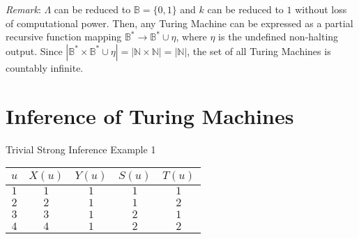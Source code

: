 \documentclass[11pt]{article}
\newcommand{\N}{\mathbb{N}}
\newcommand{\B}{\mathbb{B}}
\begin{document}
\bigbreak

\textit{Remark}: $\Lambda$ can be reduced to $ \B = \{0, 1\} $ and $ k $ can be reduced to $ 1 $ without loss of computational power. Then, any Turing Machine can be expressed as a partial recursive function mapping $ \B^{*} \rightarrow \B^{*} \cup \eta $, where $ \eta $ is the undefined non-halting output. Since $ |\B^{*} \times \B^{*} \cup \eta | = | \N \times \N | = | \N | $, the set of all Turing Machines is countably infinite. 

\pagebreak


\section{Inference of Turing Machines} 

%
%
%
% 
 
 Trivial Strong Inference Example 1 \\
 
 \begin{center}
 \begin{tabular}{ c||c|c|c|c } 

 $ u $ & $ X(u) $ & $ Y(u) $ & $ S(u) $ & $ T(u) $ \\ 
 \hline
 \hline
 $ 1 $ & $ 1 $ & $ 1 $ & $ 1 $ & $ 1 $ \\
 \hline
 $ 2 $ & $ 2 $ & $ 1 $ & $ 1 $ & $ 2 $ \\
 \hline
 $ 3 $ & $ 3 $ & $ 1 $ & $ 2 $ & $ 1 $ \\
 \hline
 $ 4 $ & $ 4 $ & $ 1 $ & $ 2 $ & $ 2 $ \\
 
 \end{tabular}
 \end{center} 
 
\end{document}

